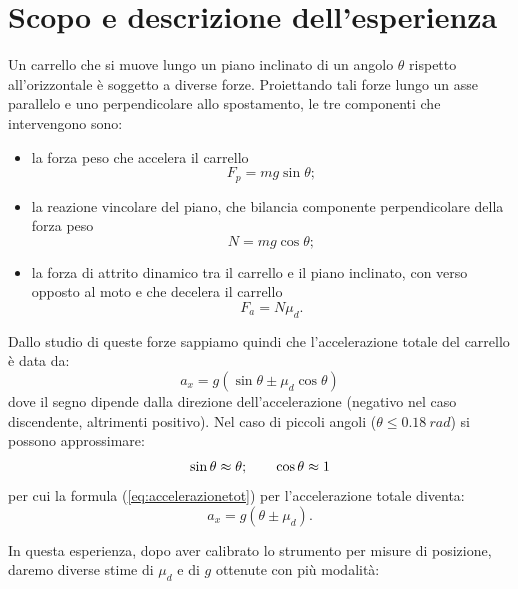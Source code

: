 \documentclass[10pt,oneside,a4paper]{article}
\begin{document}
\section{Scopo e descrizione dell'esperienza}
\label{sec:description}
Un carrello che si muove lungo un piano inclinato di un angolo $\theta$ rispetto all'orizzontale è soggetto a diverse forze. Proiettando tali forze lungo un asse parallelo e uno perpendicolare allo spostamento, le tre componenti che intervengono sono:
\begin{itemize}
	\item la forza peso che accelera il carrello
		\begin{equation}\label{eq:forzapeso}
 			 F_p=m g \sin\theta;
		\end{equation} 
   	\item la reazione vincolare del piano, che bilancia componente perpendicolare della forza peso 			
	    \begin{equation}\label{eq:reazionevincolare}
			N=mg \cos \theta;
		\end{equation}
	\item la forza di attrito dinamico tra il carrello e il piano inclinato, con verso opposto al moto e che decelera il carrello
		\begin{equation}\label{eq:forzaattrito}
			F_a=N\mu_d.
		\end{equation}
\end{itemize}
Dallo studio di queste forze sappiamo quindi che l'accelerazione totale del carrello è data da: 
\begin{equation}\label{eq:accelerazionetot}
	a_x=g(\sin\theta \pm \mu_d \cos\theta)
\end{equation}
dove il segno dipende dalla direzione dell'accelerazione (negativo nel caso discendente, altrimenti positivo). Nel caso di piccoli angoli ($\theta \le \SI{0.18}{rad}$) si possono approssimare:
\begin{equation}\label{eq:approssimazione}
	\sin\theta \approx \theta ;\qquad  \cos\theta \approx 1 \notag
\end{equation}
per cui la formula (\ref{eq:accelerazionetot}) per l'accelerazione totale diventa:
\begin{equation}\label{eq:accelerazionepiccoliangoli}
	a_x=g(\theta \pm \mu_d).
\end{equation}

In questa esperienza, dopo aver calibrato lo strumento per misure di posizione, daremo diverse stime di $\mu_d$ e di $g$ ottenute con più modalità:
\end{document}
